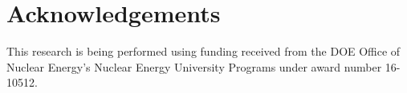\section{Acknowledgements}
This research is being performed using funding received from the DOE Office of
Nuclear Energy's Nuclear Energy University Programs under award number
16-10512. 
